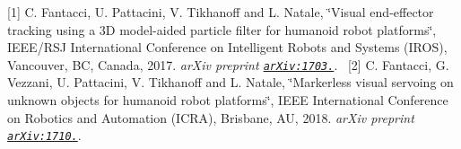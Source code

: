 \mbox{[}1\mbox{]} C. Fantacci, U. Pattacini, V. Tikhanoff and L. Natale, \char`\"{}\+Visual end-\/effector tracking using a 3\+D model-\/aided particle filter for humanoid robot platforms\char`\"{}, I\+E\+E\+E/\+R\+SJ International Conference on Intelligent Robots and Systems (I\+R\+OS), Vancouver, BC, Canada, 2017. {\itshape ar\+Xiv preprint \href{https://arxiv.org/abs/1703.04771}{\tt ar\+Xiv\+:1703.}}.~\newline
 \mbox{[}2\mbox{]} C. Fantacci, G. Vezzani, U. Pattacini, V. Tikhanoff and L. Natale, \char`\"{}\+Markerless visual servoing on unknown objects for humanoid robot platforms\char`\"{}, I\+E\+EE International Conference on Robotics and Automation (I\+C\+RA), Brisbane, AU, 2018. {\itshape ar\+Xiv preprint \href{https://arxiv.org/abs/1710.04465}{\tt ar\+Xiv\+:1710.}}. 